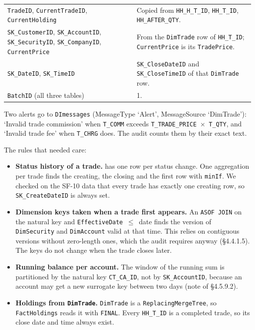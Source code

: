 \documentclass[11pt,a4paper]{article}
\newcommand{\code}[1]{\texttt{#1}}           %
\begin{document}
\begin{table}[H]
\begin{tabularx}{\textwidth}{>{\raggedright\arraybackslash}p{5.2cm} L}
\code{TradeID}, \code{CurrentTradeID}, \code{CurrentHolding}
  & Copied from \code{HH\_H\_T\_ID}, \code{HH\_T\_ID}, \code{HH\_AFTER\_QTY}. \\
\code{SK\_CustomerID}, \code{SK\_AccountID}, \code{SK\_SecurityID}, \code{SK\_CompanyID}, \code{CurrentPrice}
  & From the \code{DimTrade} row of \code{HH\_T\_ID}; \code{CurrentPrice} is its \code{TradePrice}. \\
\code{SK\_DateID}, \code{SK\_TimeID}
  & \code{SK\_CloseDateID} and \code{SK\_CloseTimeID} of that \code{DimTrade} row. \\
\midrule
\code{BatchID} (all three tables) & 1. \\
\bottomrule
\end{tabularx}
\end{table}

Two alerts go to \code{DImessages} (MessageType `Alert', MessageSource
`DimTrade'): `Invalid trade commission' when \code{T\_COMM} exceeds
\code{T\_TRADE\_PRICE}~$\times$~\code{T\_QTY}, and `Invalid trade fee' when
\code{T\_CHRG} does. The audit counts them by their exact text.

The rules that needed care:
\begin{itemize}
  \item \textbf{Status history of a trade.}  has one
    row per status change. One aggregation per trade finds the creating, the
    closing and the first row with \code{minIf}. We checked on the SF-10 data
    that every trade has exactly one creating row, so \code{SK\_CreateDateID}
    is always set.
  \item \textbf{Dimension keys taken when a trade first appears.} An
    \code{ASOF JOIN} on the natural key and \code{EffectiveDate}~$\le$~date
    finds the version of \code{DimSecurity} and \code{DimAccount} valid at
    that time. This relies on contiguous versions without zero-length ones,
    which the audit requires anyway (\S4.4.1.5). The keys do not change when
    the trade closes later.
  \item \textbf{Running balance per account.} The window of the running sum
    is partitioned by the natural key \code{CT\_CA\_ID}, not by
    \code{SK\_AccountID}, because an account may get a new surrogate key
    between two days (note of \S4.5.9.2).
  \item \textbf{Holdings from \code{DimTrade}.} \code{DimTrade} is a
    \code{ReplacingMergeTree}, so \code{FactHoldings} reads it with
    \code{FINAL}. Every \code{HH\_T\_ID} is a completed trade, so its close
    date and time always exist.
\end{itemize}
\end{document}
